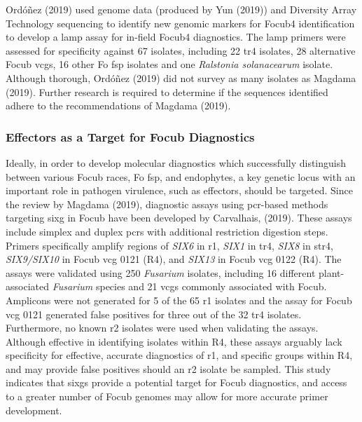 Ordóñez \et (2019) used genome data (produced by Yun \et  (2019)) and Diversity Array Technology sequencing to identify new genomic markers for \ac{Focub4} identification to develop a \ac{lamp} assay for in-field \ac{Focub4} diagnostics. The \ac{lamp} primers were assessed for specificity against 67 isolates, including 22 \ac{tr4} isolates, 28 alternative \ac{Focub} \acp{vcg}, 16 other \ac{Fo} \ac{fsp} isolates and one \textit{Ralstonia solanacearum} isolate. Although thorough, Ordóñez \et (2019) did not survey as many isolates as Magdama \et (2019). Further research is required to determine if the sequences identified adhere to the recommendations of Magdama \et (2019). 

\subsubsection{Effectors as a Target for \acl{Focub} Diagnostics}

Ideally, in order to develop molecular diagnostics which successfully distinguish between various \ac{Focub} races, \ac{Fo} \ac{fsp}, and endophytes, a key genetic locus with an important role in pathogen virulence, such as effectors, should be targeted. Since the review by Magdama \et (2019), diagnostic assays using \ac{pcr}-based methods targeting \ac{sixg} in \ac{Focub} have been developed by Carvalhais, \et (2019). These assays include simplex and duplex \acp{pcr} with additional restriction digestion steps. Primers specifically amplify regions of \textit{SIX6} in \ac{r1}, \textit{SIX1} in \ac{tr4}, \textit{SIX8} in \ac{str4}, \textit{SIX9/SIX10} in \ac{Focub} \ac{vcg} 0121 (R4), and \textit{SIX13} in \ac{Focub} \ac{vcg} 0122 (R4). The assays were validated using 250 \textit{Fusarium} isolates, including 16 different plant-associated \textit{Fusarium} species and 21 \acp{vcg}  commonly associated with \ac{Focub}. Amplicons were not generated for 5 of the 65 \ac{r1} isolates and the assay for \ac{Focub} \ac{vcg} 0121 generated false positives for three out of the 32 \ac{tr4} isolates. Furthermore, no known \ac{r2} isolates were used when validating the assays. Although effective in identifying isolates within R4, these assays arguably lack specificity for effective, accurate diagnostics of \ac{r1}, and specific groups within R4, and may provide false positives should an \ac{r2} isolate be sampled. This study indicates that \acp{sixg} provide a potential target for \ac{Focub} diagnostics, and access to a greater number of \ac{Focub} genomes may allow for more accurate primer development.  

